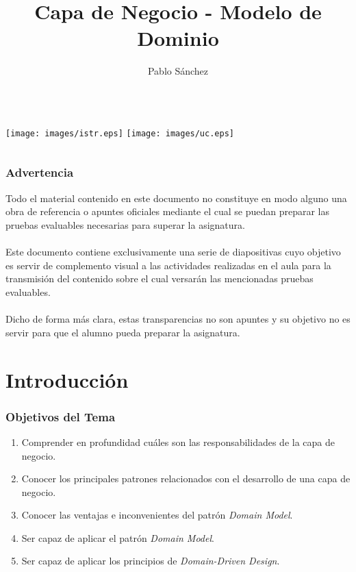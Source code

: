 \documentclass[handout,a4paper,slidestop,xcolor=pst,blue]{beamer}
\title[Modelo de Dominio]{Capa de Negocio - Modelo de Dominio}
\author[P. Sanchez]{\alert{Pablo Sánchez}}
\institute[IIE]{
		   Dpto. Ingeniería Informática y Electrónica \\
		   Universidad de Cantabria \\
		   Santander (Cantabria, España) \\
		   \texttt{p.sanchez@unican.es}
}
\date{}
\begin{document}
\begin{frame}[c]
	\titlepage
	\begin{columns}
			\centering
   		     \texttt{[image: images/istr.eps]}
			\centering
			\texttt{[image: images/uc.eps]}
	\end{columns}
\end{frame}

\begin{frame}[c]
    \frametitle{\alert{Advertencia}}
    \begin{center}
        Todo el material contenido en este documento no constituye en modo alguno una obra de referencia o apuntes oficiales mediante el cual se puedan preparar las pruebas evaluables necesarias para superar la asignatura. \ \\
        \ \\
        Este documento contiene exclusivamente una serie de diapositivas cuyo objetivo es servir de complemento visual a las actividades realizadas en el aula para la transmisión del contenido sobre el cual versarán las mencionadas pruebas evaluables.  \ \\
        \ \\
        Dicho de forma más clara, \alert{estas transparencias no son apuntes y su objetivo no es servir para que el alumno pueda preparar la asignatura.}
    \end{center}
\end{frame}

\section{Introducción}

\begin{frame}[c]
    \frametitle{Objetivos del Tema}
    \begin{enumerate}[<+->]
         \item Comprender en profundidad cuáles son las responsabilidades de la capa de negocio.
         \item Conocer los principales patrones relacionados con el desarrollo de una capa de negocio.
         \item Conocer las ventajas e inconvenientes del patrón \emph{Domain Model}.
         \item Ser capaz de aplicar el patrón \emph{Domain Model}.
         \item Ser capaz de aplicar los principios de \emph{Domain-Driven Design}.
    \end{enumerate}
\end{frame}
\end{document}
